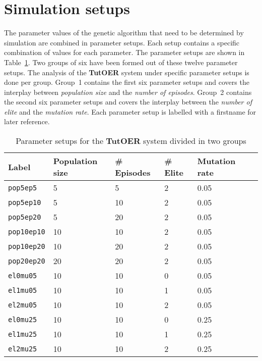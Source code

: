 \section{Simulation setups}
\label{sec:simulations_simulations}
The parameter values of the genetic algorithm that need to be determined by
simulation are combined in parameter setups. Each setup contains a specific
combination of values for each parameter. The parameter setups are shown in
Table~\ref{tab:simulation_setups}. Two groups of six have been formed out of
these twelve parameter setups. The analysis of the \textbf{TutOER} system under
specific parameter setups is done per group. Group~1 contains the first six
parameter setups and covers the interplay between \emph{population size} and
the \emph{number of episodes}. Group~2 contains the second six parameter setups
and covers the interplay between the \emph{number of elite} and the
\emph{mutation rate}. Each parameter setup is labelled with a firstname for
later reference.\\
\begin{table}[h!]
	\centering
	\caption{Parameter setups for the \textbf{TutOER} system divided in two groups}
	\label{tab:simulation_setups}
	\begin{tabular}{llllll}\hline
		\textbf{Label} & \textbf{Population size} & \textbf{\# Episodes}
		& \textbf{\# Elite} & \textbf{Mutation rate} \\\hline
		\texttt{pop5ep5} & 5 & 5 & 2 & 0.05 \\ %
		\texttt{pop5ep10} & 5 & 10 & 2 & 0.05 \\ %
		\texttt{pop5ep20} & 5 & 20 & 2 & 0.05 \\ %
		\texttt{pop10ep10} & 10 & 10 & 2 & 0.05 \\ %
		\texttt{pop10ep20} & 10 & 20 & 2 & 0.05 \\ %
		\texttt{pop20ep20} & 20 & 20 & 2 & 0.05 \\\hdashline %
		\texttt{el0mu05} & 10 & 10 & 0 & 0.05 \\ %
		\texttt{el1mu05} & 10 & 10 & 1 & 0.05 \\ %
		\texttt{el2mu05} & 10 & 10 & 2 & 0.05 \\ %
		\texttt{el0mu25} & 10 & 10 & 0 & 0.25 \\ %
		\texttt{el1mu25} & 10 & 10 & 1 & 0.25 \\ %
		\texttt{el2mu25} & 10 & 10 & 2 & 0.25 \\ %
	\end{tabular}
\end{table}\\
